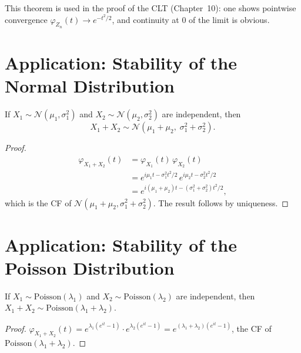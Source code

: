 \begin{remark}
This theorem is used in the proof of the CLT (Chapter~10): one shows pointwise
convergence $\varphi_{Z_n}(t) \to e^{-t^2/2}$, and continuity at $0$ of the limit
is obvious.
\end{remark}

\section{Application: Stability of the Normal Distribution}

\begin{theorem}
If $X_1 \sim \mathcal{N}(\mu_1, \sigma_1^2)$ and
$X_2 \sim \mathcal{N}(\mu_2, \sigma_2^2)$ are independent, then
\[
    X_1 + X_2 \sim \mathcal{N}(\mu_1+\mu_2,\; \sigma_1^2+\sigma_2^2).
\]
\end{theorem}

\begin{proof}
\begin{align*}
    \varphi_{X_1+X_2}(t) &= \varphi_{X_1}(t)\,\varphi_{X_2}(t) \\
    &= e^{i\mu_1 t - \sigma_1^2 t^2/2}\,e^{i\mu_2 t - \sigma_2^2 t^2/2} \\
    &= e^{i(\mu_1+\mu_2)t - (\sigma_1^2+\sigma_2^2)t^2/2},
\end{align*}
which is the CF of $\mathcal{N}(\mu_1+\mu_2, \sigma_1^2+\sigma_2^2)$. The result
follows by uniqueness.
\end{proof}

\section{Application: Stability of the Poisson Distribution}

\begin{proposition}
If $X_1 \sim \mathrm{Poisson}(\lambda_1)$ and
$X_2 \sim \mathrm{Poisson}(\lambda_2)$ are independent, then
$X_1 + X_2 \sim \mathrm{Poisson}(\lambda_1+\lambda_2)$.
\end{proposition}

\begin{proof}
$\varphi_{X_1+X_2}(t) = e^{\lambda_1(e^{it}-1)}\cdot e^{\lambda_2(e^{it}-1)}
= e^{(\lambda_1+\lambda_2)(e^{it}-1)}$, the CF of
$\mathrm{Poisson}(\lambda_1+\lambda_2)$.
\end{proof}

